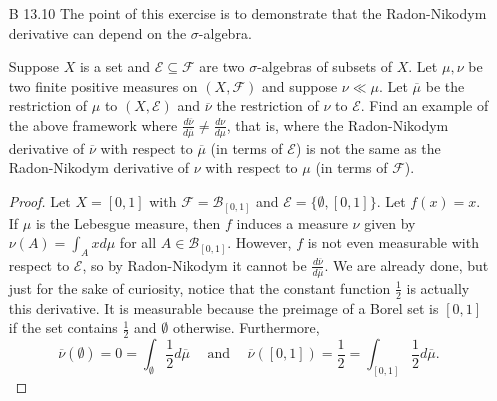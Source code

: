 \documentclass[10pt]{article}
\newcommand{\Int}{{\displaystyle \int}}
\newcommand{\B}{\mathcal{B}}
\newcommand{\dd}[2]{\frac{d#1}{d#2}}
\renewcommand{\bar}{\overline}
\begin{document}
\begin{enumerate}
\item[B 13.10] The point of this exercise is to demonstrate that the Radon-Nikodym derivative can depend on the $\sigma$-algebra.

\newcommand{\E}{\mathcal{E}}
\newcommand{\F}{\mathcal{F}}

Suppose $X$ is a set and $\mathcal{E} \subseteq \mathcal{F}$ are two $\sigma$-algebras of subsets of $X$.  Let $\mu,\nu$ be two finite positive measures on $(X,\mathcal{F})$ and suppose $\nu \ll \mu$.  Let $\bar{\mu}$ be the restriction of $\mu$ to $(X, \mathcal{E})$ and $\bar{\nu}$ the restriction of $\nu$ to $\E$.  Find an example of the above framework where $\dd{\bar{\nu}}{\bar{\mu}} \neq \dd{\nu}{\mu}$, that is, where the Radon-Nikodym derivative of $\bar{\nu}$ with respect to $\bar{\mu}$ (in terms of $\E$) is not the same as the Radon-Nikodym derivative of $\nu$ with respect to $\mu$ (in terms of $\F$).

\begin{proof}
Let $X = [0,1]$ with $\F = \B_{[0,1]}$ and $\E = \{\emptyset, [0,1]\}$.  Let $f(x) = x$.  If $\mu$ is the Lebesgue measure, then $f$ induces a measure $\nu$ given by $\nu(A) = \Int_A x d\mu$ for all $A \in \B_{[0,1]}$.  However, $f$ is not even measurable with respect to $\E$, so by Radon-Nikodym it cannot be $\dd{\bar{\nu}}{\bar{\mu}}$.  We are already done, but just for the sake of curiosity, notice that the constant function $\frac12$ is actually this derivative.  It is measurable because the preimage of a Borel set is $[0,1]$ if the set contains $\frac12$ and $\emptyset$ otherwise.  Furthermore,
$$
\bar{\nu}(\emptyset) = 0 = \int_\emptyset \frac12 d\bar{\mu} \hspace{15pt} \text{and} \hspace{15pt} \bar{\nu}([0,1]) = \frac12 = \int_{[0,1]} \frac12 d\bar{\mu}.
$$
\end{proof}

\end{enumerate}
\end{document}
